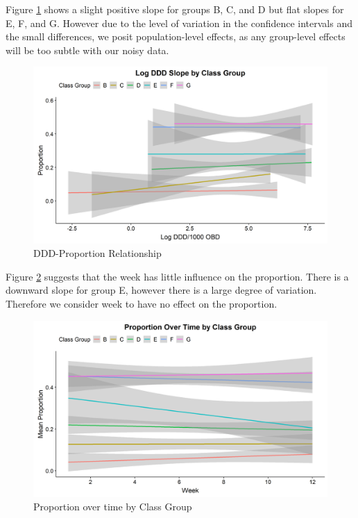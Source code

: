 \documentclass[11pt,twoside]{article}
\numberwithin{Theorem}{section}
\numberwithin{Definition}{section}
\numberwithin{Lemma}{section}
\numberwithin{Algorithm}{section}
\numberwithin{equation}{section}
\begin{document}
Figure \ref{fig::EDA_ClassDDDSlope} shows a slight positive slope for groups B, C, and D but flat slopes for E, F, and G. However due to the level of variation in the confidence intervals and the small differences, we posit population-level effects, as any group-level effects will be too subtle with our noisy data.  

\begin{figure}[h!]
	\centering
	\includegraphics[height = 0.25\textheight]{Figures/2_2_EDA_ClassDDDSlope.png}
	\caption{DDD-Proportion Relationship} \label{fig::EDA_ClassDDDSlope}	
\end{figure}

Figure \ref{fig::EDA_ClassWeek} suggests that the week has little influence on the proportion. There is a downward slope for group E, however there is a large degree of variation. Therefore we consider week to have no effect on the proportion. 

\begin{figure}[h!]
	\centering
	\includegraphics[height = 0.25\textheight]{Figures/2_2_EDA_ClassWeek.png}
	\caption{Proportion over time by Class Group} \label{fig::EDA_ClassWeek}	
\end{figure}
\end{document}
